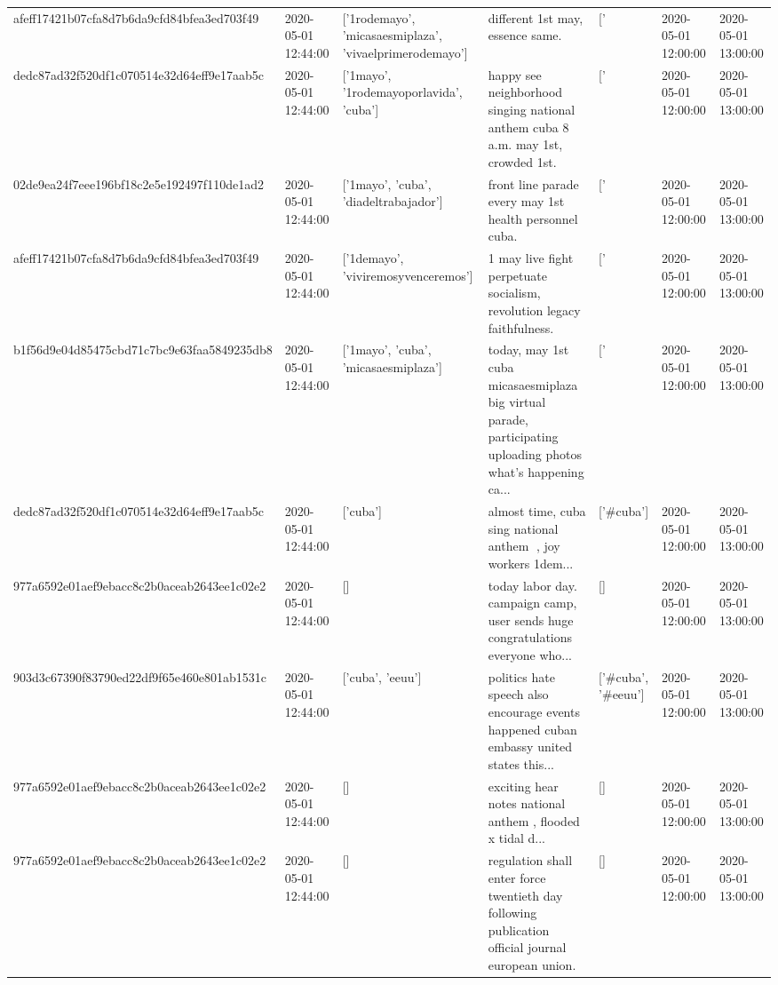 \begin{tabular}{lllllll}
afeff17421b07cfa8d7b6da9cfd84bfea3ed703f49 & 2020-05-01 12:44:00 & ['1rodemayo', 'micasaesmiplaza', 'vivaelprimerodemayo'] & different 1st may, essence same. & ['#1rodemayo', '#micasaesmiplaza', '#vivaelprimerodemayo'] & 2020-05-01 12:00:00 & 2020-05-01 13:00:00 \\
dedc87ad32f520df1c070514e32d64eff9e17aab5c & 2020-05-01 12:44:00 & ['1mayo', '1rodemayoporlavida', 'cuba'] & happy see neighborhood singing national anthem cuba 8 a.m. may 1st, crowded 1st. & ['#1mayo', '#1rodemayoporlavida', '#cuba'] & 2020-05-01 12:00:00 & 2020-05-01 13:00:00 \\
02de9ea24f7eee196bf18c2e5e192497f110de1ad2 & 2020-05-01 12:44:00 & ['1mayo', 'cuba', 'diadeltrabajador'] & front line parade every may 1st health personnel cuba. & ['#1mayo', '#cuba', '#diadeltrabajador'] & 2020-05-01 12:00:00 & 2020-05-01 13:00:00 \\
afeff17421b07cfa8d7b6da9cfd84bfea3ed703f49 & 2020-05-01 12:44:00 & ['1demayo', 'viviremosyvenceremos'] & 1 may live fight perpetuate socialism, revolution legacy faithfulness. & ['#1demayo', '#viviremosyvenceremos'] & 2020-05-01 12:00:00 & 2020-05-01 13:00:00 \\
b1f56d9e04d85475cbd71c7bc9e63faa5849235db8 & 2020-05-01 12:44:00 & ['1mayo', 'cuba', 'micasaesmiplaza'] & today, may 1st cuba micasaesmiplaza big virtual parade, participating uploading photos what's happening ca... & ['#1mayo', '#cuba', '#micasaesmiplaza'] & 2020-05-01 12:00:00 & 2020-05-01 13:00:00 \\
dedc87ad32f520df1c070514e32d64eff9e17aab5c & 2020-05-01 12:44:00 & ['cuba'] & almost time, cuba sing national anthem 🎵, joy workers 1dem... & ['#cuba'] & 2020-05-01 12:00:00 & 2020-05-01 13:00:00 \\
977a6592e01aef9ebacc8c2b0aceab2643ee1c02e2 & 2020-05-01 12:44:00 & [] & today labor day. campaign camp, user sends huge congratulations everyone who... & [] & 2020-05-01 12:00:00 & 2020-05-01 13:00:00 \\
903d3c67390f83790ed22df9f65e460e801ab1531c & 2020-05-01 12:44:00 & ['cuba', 'eeuu'] & politics hate speech also encourage events happened cuban embassy united states this... & ['#cuba', '#eeuu'] & 2020-05-01 12:00:00 & 2020-05-01 13:00:00 \\
977a6592e01aef9ebacc8c2b0aceab2643ee1c02e2 & 2020-05-01 12:44:00 & [] & exciting hear notes national anthem ️, flooded x tidal d... & [] & 2020-05-01 12:00:00 & 2020-05-01 13:00:00 \\
977a6592e01aef9ebacc8c2b0aceab2643ee1c02e2 & 2020-05-01 12:44:00 & [] & regulation shall enter force twentieth day following publication official journal european union. & [] & 2020-05-01 12:00:00 & 2020-05-01 13:00:00 \\

\end{tabular}
